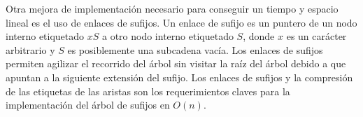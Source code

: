 \documentclass[12pt,a4paper]{article}
\begin{document}
\indent
Otra mejora de implementación necesario para conseguir un tiempo y espacio 
lineal es el uso de enlaces de sufijos. Un enlace de sufijo es un puntero de un 
nodo interno etiquetado $xS$ a otro nodo interno etiquetado $S$, donde $x$ es un 
carácter arbitrario y $S$ es posiblemente una subcadena vacía. Los enlaces de 
sufijos permiten agilizar el recorrido del árbol sin visitar la raíz del árbol 
debido a que apuntan a la siguiente extensión del sufijo. Los enlaces de sufijos 
y la compresión de las etiquetas de las aristas son los requerimientos claves 
para la implementación del árbol de sufijos en $O(n)$.\\
\end{document}
